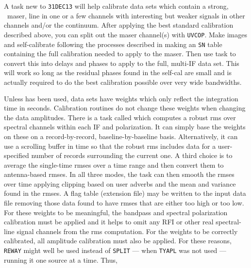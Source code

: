 A task new to {\tt 31DEC13} will help calibrate data sets which
contain a strong, \eg\ maser, line in one or a few channels with
interesting but weaker signals in other channels and/or the continuum.
After applying the best standard calibration described above, you can
split out the maser channel(s) with {\tt UVCOP}\@.  Make images and
self-calibrate following the processes described in 
making an {\tt SN} table containing the full calibration needed to
apply to the maser.  Then use task {\tt {}} to convert this
into delays and phases to apply to the full, multi-IF data set.  This
will work so long as the residual phases found in the self-cal are
small and is actually required to do the best calibration possible
over very wide bandwidths.

Unless {\tt {}} has been used,  data sets have
weights which only reflect the integration time in seconds.
Calibration routines do not change these weights when changing the
data amplitudes.  There is a task called {\tt {}} which
computes a robust rms over spectral channels within each IF and
polarization.  It can simply base the weights on these on a
record-by-record, baseline-by-baseline basis.  Alternatively, it can
use a scrolling buffer in time so that the robust rms includes data
for a user-specified number of records surrounding the current one.  A
third choice is to average the single-time rmses over a time range and
then convert them to antenna-based rmses.  In all three modes, the
task can then smooth the rmses over time applying clipping based on
user adverbs and the mean and variance found in the rmses.  A flag
table (extension file) may be written to the input data file removing
those data found to have rmses that are either too high or too low.
For these weights to be meaningful, the bandpass and spectral
polarization calibration must be applied and it helps to omit any RFI
or other real spectral-line signal channels from the rms computation.
For the weights to be correctly calibrated, all amplitude calibration
must also be applied.  For these reasons, {\tt REWAY} might well be
used instead of {\tt SPLIT} --- when {\tt TYAPL} was not used ---
running it one source at a time.  Thus,
